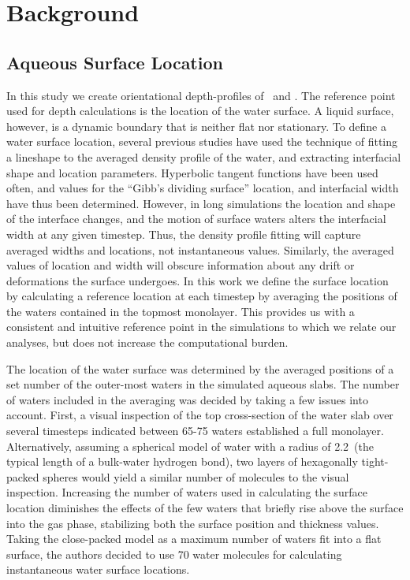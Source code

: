 \section{Background}

\subsection {Aqueous Surface Location}

	In this study we create orientational depth-profiles of \suldiox~and \wat. The reference point used for depth calculations is the location of the water surface. A liquid surface, however, is a dynamic boundary that is neither flat nor stationary. To define a water surface location, several previous studies have used the technique of fitting a lineshape to the averaged density profile of the water, and extracting interfacial shape and location parameters.\cite{Shamay2010,Wick2006c,Chowdhary2006} Hyperbolic tangent functions have been used often, and values for the ``Gibb's dividing surface'' location, and interfacial width have thus been determined.\cite{Matsumoto1988} However, in long simulations the location and shape of the interface changes, and the motion of surface waters alters the interfacial width at any given timestep. Thus, the density profile fitting will capture averaged widths and locations, not instantaneous values. Similarly, the averaged values of location and width will obscure information about any drift or deformations the surface undergoes. In this work we define the surface location by calculating a reference location at each timestep by averaging the positions of the waters contained in the topmost monolayer. This provides us with a consistent and intuitive reference point in the simulations to which we relate our analyses, but does not increase the computational burden.

  The location of the water surface was determined by the averaged positions of a set number of the outer-most waters in the simulated aqueous slabs. The number of waters included in the averaging was decided by taking a few issues into account. First, a visual inspection of the top cross-section of the water slab over several timesteps indicated between 65-75 waters established a full monolayer. Alternatively, assuming a spherical model of water with a radius of 2.2\angs~(the typical length of a bulk-water hydrogen bond), two layers of hexagonally tight-packed spheres would yield a similar number of molecules to the visual inspection. Increasing the number of waters used in calculating the surface location diminishes the effects of the few waters that briefly rise above the surface into the gas phase, stabilizing both the surface position and thickness values. Taking the close-packed model as a maximum number of waters fit into a flat surface, the authors decided to use 70 water molecules for calculating instantaneous water surface locations. 
  
